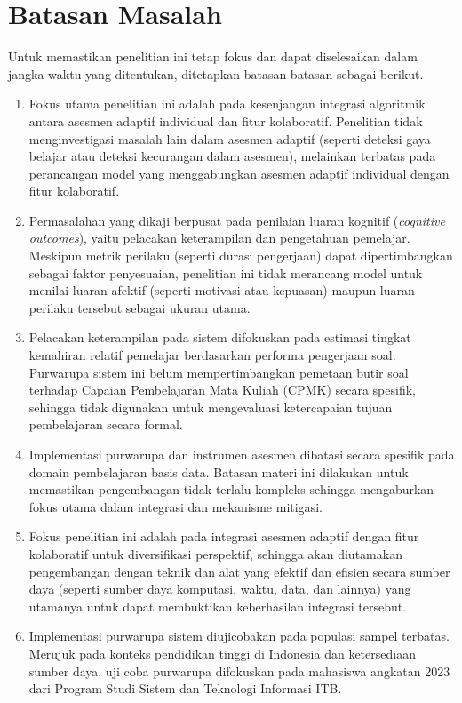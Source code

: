 \section{Batasan Masalah}
\label{sec:batasan_masalah}
Untuk memastikan penelitian ini tetap fokus dan dapat diselesaikan dalam jangka waktu yang ditentukan, ditetapkan batasan-batasan sebagai berikut.
\begin{enumerate}
  \item Fokus utama penelitian ini adalah pada kesenjangan integrasi
  algoritmik antara asesmen adaptif individual dan fitur kolaboratif. Penelitian
  tidak menginvestigasi masalah lain dalam asesmen adaptif (seperti deteksi
  gaya belajar atau deteksi kecurangan dalam asesmen), melainkan terbatas pada
  perancangan model yang menggabungkan asesmen adaptif individual dengan fitur
  kolaboratif.
  \item Permasalahan yang dikaji berpusat pada penilaian luaran kognitif
  (\textit{cognitive outcomes}), yaitu pelacakan keterampilan dan pengetahuan
  pemelajar. Meskipun metrik perilaku (seperti durasi pengerjaan) dapat dipertimbangkan
  sebagai faktor penyesuaian, penelitian ini
  tidak merancang model untuk menilai luaran afektif (seperti motivasi atau kepuasan)
  maupun luaran perilaku tersebut sebagai ukuran utama.
  \item Pelacakan keterampilan pada sistem difokuskan pada estimasi tingkat kemahiran relatif pemelajar berdasarkan performa pengerjaan soal. Purwarupa sistem ini belum mempertimbangkan pemetaan butir soal terhadap Capaian Pembelajaran Mata Kuliah (CPMK) secara spesifik, sehingga tidak digunakan untuk mengevaluasi ketercapaian tujuan pembelajaran secara formal.
  \item Implementasi purwarupa dan instrumen asesmen dibatasi secara spesifik pada
  domain pembelajaran basis data. Batasan materi ini dilakukan untuk memastikan pengembangan tidak terlalu kompleks sehingga mengaburkan fokus utama dalam integrasi dan mekanisme mitigasi.
  \item Fokus penelitian ini adalah pada integrasi asesmen adaptif dengan fitur kolaboratif untuk diversifikasi perspektif, sehingga akan diutamakan pengembangan dengan teknik dan alat yang efektif dan efisien secara sumber daya (seperti sumber daya komputasi, waktu, data, dan lainnya) yang utamanya untuk dapat membuktikan keberhasilan integrasi tersebut.
  \item Implementasi purwarupa sistem diujicobakan pada populasi sampel terbatas.
  Merujuk pada konteks pendidikan tinggi di Indonesia dan ketersediaan sumber daya,
  uji coba purwarupa difokuskan pada mahasiswa angkatan 2023 dari Program Studi Sistem dan Teknologi Informasi ITB.
\end{enumerate}

